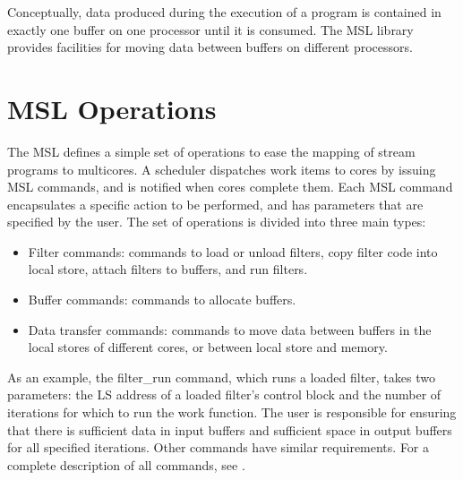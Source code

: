 


Conceptually, data produced during the execution of a program is
contained in exactly one buffer on one processor
until it is consumed. The MSL library provides facilities for moving
data between buffers on different processors.
 
\section{MSL Operations}

The MSL defines a simple set of operations to ease the mapping of stream
programs to multicores. A scheduler dispatches work items to cores by
issuing MSL commands, and is notified when cores complete
them. Each MSL command encapsulates a specific action to be
performed, and has parameters that are specified by the user. The
set of operations is divided into three main types:
\begin{itemize}
\item Filter commands: commands to load or unload filters, copy filter code into local store, attach filters to buffers, and run filters.
\item Buffer commands: commands to allocate buffers.
\item Data transfer commands: commands to move data between buffers in the local stores of different cores, or between local store and memory.
\end{itemize}

As an example, the \textsf{filter\_run} command, which runs a loaded
filter, takes two parameters: the LS address of a loaded filter's
control block and the number of iterations for which to run the work function.
The user is responsible for ensuring that there is sufficient
data in input buffers and sufficient space in output buffers for all
specified iterations. Other commands have similar requirements. For a
complete description of all commands, see \cite{dxzhang-meng-07}.

